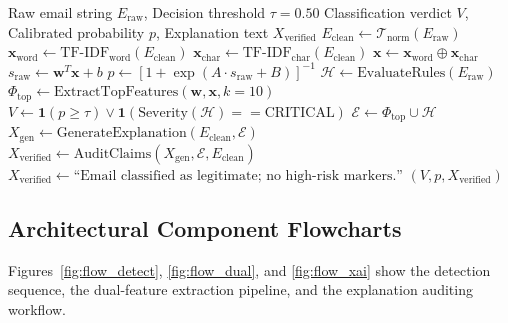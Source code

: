 \documentclass[conference]{IEEEtran}
\begin{document}
\begin{algorithm}[!t]
\caption{PhishGuard AI End-to-End Inference Procedure}
\label{alg:phishguard}
\begin{algorithmic}[1]
\Require Raw email string $E_{\text{raw}}$, Decision threshold $\tau = 0.50$
\Ensure Classification verdict $V$, Calibrated probability $p$, Explanation text $X_{\text{verified}}$
\State $E_{\text{clean}} \gets \mathcal{T}_{\text{norm}}(E_{\text{raw}})$ 
\State $\mathbf{x}_{\text{word}} \gets \text{TF-IDF}_{\text{word}}(E_{\text{clean}})$
\State $\mathbf{x}_{\text{char}} \gets \text{TF-IDF}_{\text{char}}(E_{\text{clean}})$
\State $\mathbf{x} \gets \mathbf{x}_{\text{word}} \oplus \mathbf{x}_{\text{char}}$
\State $s_{\text{raw}} \gets \mathbf{w}^T \mathbf{x} + b$ 
\State $p \gets [1 + \exp(A \cdot s_{\text{raw}} + B)]^{-1}$ 
\State $\mathcal{H} \gets \text{EvaluateRules}(E_{\text{raw}})$ 
\State $\Phi_{\text{top}} \gets \text{ExtractTopFeatures}(\mathbf{w}, \mathbf{x}, k=10)$
\State $V \gets \mathbf{1}(p \ge \tau) \lor \mathbf{1}(\text{Severity}(\mathcal{H}) == \text{CRITICAL})$
    \State $\mathcal{E} \gets \Phi_{\text{top}} \cup \mathcal{H}$
    \State $X_{\text{gen}} \gets \text{GenerateExplanation}(E_{\text{clean}}, \mathcal{E})$
    \State $X_{\text{verified}} \gets \text{AuditClaims}(X_{\text{gen}}, \mathcal{E}, E_{\text{clean}})$
\Else
    \State $X_{\text{verified}} \gets \text{``Email classified as legitimate; no high-risk markers.''}$
\EndIf
\State \Return $(V, p, X_{\text{verified}})$
\end{algorithmic}
\end{algorithm}

\subsection{Architectural Component Flowcharts}
Figures~\ref{fig:flow_detect}, \ref{fig:flow_dual}, and \ref{fig:flow_xai} show the detection sequence, the dual-feature extraction pipeline, and the explanation auditing workflow.
\end{document}
